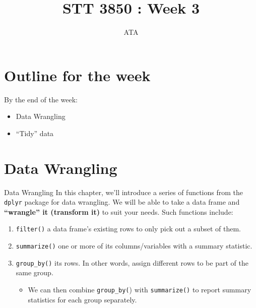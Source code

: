 \documentclass[
  ignorenonframetext,
]{beamer}
\title{STT 3850 : Week 3}
\author{ATA}
\date{}
\institute{Appalachian State University}
\providecommand{\tightlist}{%
  \setlength{\itemsep}{0pt}\setlength{\parskip}{0pt}}
\begin{document}
\frame{\titlepage}

\section{Outline for the week}\label{outline-for-the-week}

\begin{frame}{By the end of the week:}
\label{by-the-end-of-the-week}
\begin{itemize}
\tightlist
\item
  Data Wrangling
\item
  ``Tidy'' data
\end{itemize}
\end{frame}

\section{Data Wrangling}\label{data-wrangling}

\begin{frame}[fragile]{Data Wrangling}
\label{data-wrangling-1}
In this chapter, we'll introduce a series of functions from the
\texttt{dplyr} package for data wrangling. We will be able to take a
data frame and \textbf{``wrangle'' it (transform it)} to suit your
needs. Such functions include:

\begin{enumerate}
\item
  \texttt{filter()} a data frame's existing rows to only pick out a
  subset of them.
\item
  \texttt{summarize()} one or more of its columns/variables with a
  summary statistic.
\item
  \texttt{group\_by()} its rows. In other words, assign different rows
  to be part of the same group.

  \begin{itemize}
  \tightlist
  \item
    We can then combine \texttt{group\_by(}) with \texttt{summarize()}
    to report summary statistics for each group separately.
  \end{itemize}
\end{enumerate}
\end{frame}
\end{document}
